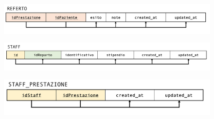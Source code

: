 \documentclass[paper=a4, fontsize=11pt,x11names]{report}
\begin{document}
\begin{figure}[H]
\begin{center}
\includegraphics[scale=0.35]{immagini_normalizzazione/referto}
\end{center}
\end{figure}

\begin{figure}[H]
\begin{center}
\includegraphics[scale=0.35]{immagini_normalizzazione/staff}
\end{center}
\end{figure}

\begin{figure}[H]
\begin{center}
\includegraphics[scale=0.35]{immagini_normalizzazione/staff_prestazione}
\end{center}
\end{figure}
\end{document}
